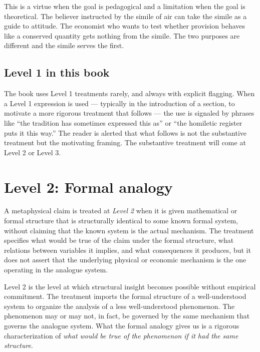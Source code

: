 This is a virtue when the goal is pedagogical and a limitation when
the goal is theoretical. The believer instructed by the simile of
air can take the simile as a guide to attitude. The economist who
wants to test whether provision behaves like a conserved quantity
gets nothing from the simile. The two purposes are different and
the simile serves the first.

\subsection{Level 1 in this book}

The book uses Level 1 treatments rarely, and always with explicit
flagging. When a Level 1 expression is used --- typically in the
introduction of a section, to motivate a more rigorous treatment that
follows --- the use is signaled by phrases like ``the tradition has
sometimes expressed this as'' or ``the homiletic register puts it
this way.'' The reader is alerted that what follows is not the
substantive treatment but the motivating framing. The substantive
treatment will come at Level 2 or Level 3.

\section{Level 2: Formal analogy}
\label{sec:level-2}

\begin{definition}
\label{def:formal-analogy}
A metaphysical claim is treated at \emph{Level 2} when it is given
mathematical or formal structure that is structurally identical to
some known formal system, without claiming that the known system is
the actual mechanism. The treatment specifies what would be true of
the claim under the formal structure, what relations between
variables it implies, and what consequences it produces, but it does
not assert that the underlying physical or economic mechanism is the
one operating in the analogue system.
\end{definition}

Level 2 is the level at which structural insight becomes possible
without empirical commitment. The treatment imports the formal
structure of a well-understood system to organize the analysis of a
less well-understood phenomenon. The phenomenon may or may not, in
fact, be governed by the same mechanism that governs the analogue
system. What the formal analogy gives us is a rigorous characterization
of \emph{what would be true of the phenomenon if it had the same
structure}.

